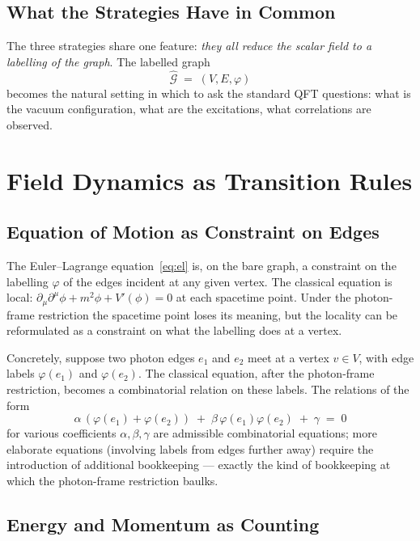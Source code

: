 \documentclass[11pt]{article}
\begin{document}
\subsection{What the Strategies Have in Common}

The three strategies share one feature: \emph{they all reduce the scalar field to a labelling of the graph}. The labelled graph
\[
\widehat{\mathcal{G}} \;=\; (V, E, \varphi)
\]
becomes the natural setting in which to ask the standard QFT questions: what is the vacuum configuration, what are the excitations, what correlations are observed.

\section{Field Dynamics as Transition Rules}
\label{sec:dynamics}

\subsection{Equation of Motion as Constraint on Edges}

The Euler--Lagrange equation~\eqref{eq:el} is, on the bare graph, a constraint on the labelling $\varphi$ of the edges incident at any given vertex. The classical equation is local: $\partial_\mu \partial^\mu \phi + m^2 \phi + V'(\phi) = 0$ at each spacetime point. Under the photon-frame restriction the spacetime point loses its meaning, but the locality can be reformulated as a constraint on what the labelling does at a vertex.

Concretely, suppose two photon edges $e_1$ and $e_2$ meet at a vertex $v \in V$, with edge labels $\varphi(e_1)$ and $\varphi(e_2)$. The classical equation, after the photon-frame restriction, becomes a combinatorial relation on these labels. The relations of the form
\[
\alpha\,(\varphi(e_1) + \varphi(e_2)) \;+\; \beta\, \varphi(e_1)\varphi(e_2) \;+\; \gamma \;=\; 0
\]
for various coefficients $\alpha, \beta, \gamma$ are admissible combinatorial equations; more elaborate equations (involving labels from edges further away) require the introduction of additional bookkeeping --- exactly the kind of bookkeeping at which the photon-frame restriction baulks.

\subsection{Energy and Momentum as Counting}
\end{document}
